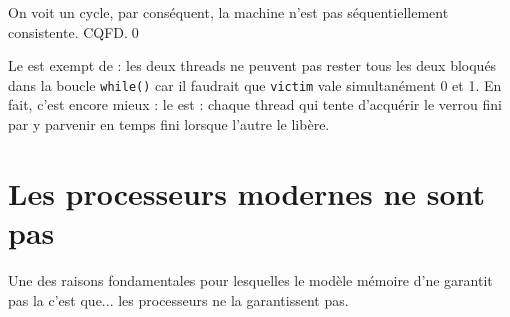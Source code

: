 \begin{myproof}
\begin{center}
\end{center}





  On voit un cycle, par conséquent, la machine n'est pas séquentiellement consistente. CQFD.\qed
\end{myproof}

Le  est exempt de  : les deux threads
ne peuvent pas rester tous les deux bloqués dans la boucle
\texttt{while()} car il faudrait que \texttt{victim} vale simultanément 0
et 1. En fait, c'est encore mieux : le  est
 : chaque thread qui tente d'acquérir le verrou fini
par y parvenir en temps fini lorsque l'autre le libère.


\section{Les processeurs modernes ne sont pas }
\label{sec:CPU-not-SC}

Une des raisons fondamentales pour lesquelles le modèle mémoire d'\OMP ne
garantit pas la  c'est que... les processeurs ne
la garantissent pas.

